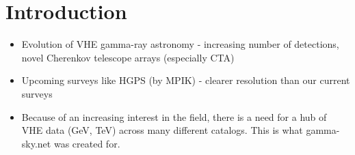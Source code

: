 \section{Introduction}


%
%  

\begin{itemize}

\item Evolution of VHE gamma-ray astronomy - increasing number of detections, novel Cherenkov telescope arrays (especially CTA)

\item Upcoming surveys like HGPS (by MPIK) - clearer resolution than our current surveys

\item Because of an increasing interest in the field, there is a need for a hub of VHE data (GeV, TeV) across many different catalogs.
This is what gamma-sky.net was created for.

\end{itemize}
